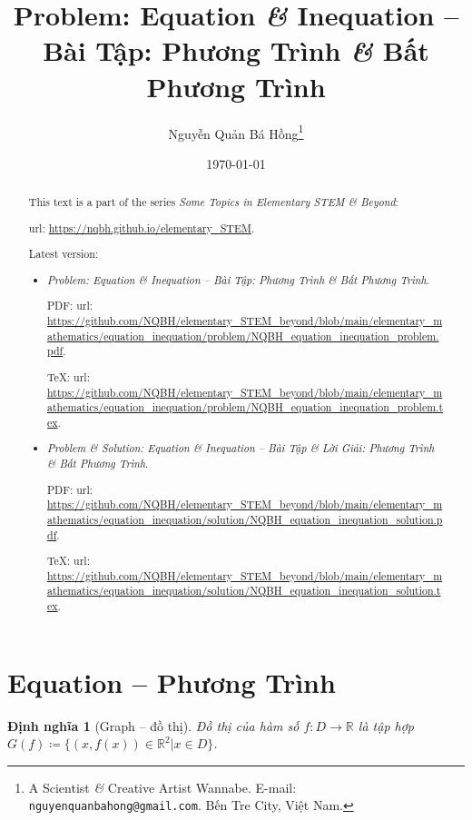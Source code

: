 \documentclass{article}
\title{Problem: Equation {\it\&} Inequation -- Bài Tập: Phương Trình {\it\&} Bất Phương Trình}
\author{Nguyễn Quản Bá Hồng\footnote{A Scientist {\it\&} Creative Artist Wannabe. E-mail: {\tt nguyenquanbahong@gmail.com}. Bến Tre City, Việt Nam.}}
\date{\today}
\newtheorem{dinhnghia}{Định nghĩa}
\begin{document}
\maketitle
\begin{abstract}
	This text is a part of the series {\it Some Topics in Elementary STEM \& Beyond}:
	
	{\sc url}: \url{https://nqbh.github.io/elementary_STEM}.
	
	Latest version:
	\begin{itemize}
		\item {\it Problem: Equation \& Inequation -- Bài Tập: Phương Trình \& Bất Phương Trình}.
		
		PDF: {\sc url}: \url{https://github.com/NQBH/elementary_STEM_beyond/blob/main/elementary_mathematics/equation_inequation/problem/NQBH_equation_inequation_problem.pdf}.
		
		\TeX: {\sc url}: \url{https://github.com/NQBH/elementary_STEM_beyond/blob/main/elementary_mathematics/equation_inequation/problem/NQBH_equation_inequation_problem.tex}.
		\item {\it Problem \& Solution: Equation \& Inequation -- Bài Tập \& Lời Giải: Phương Trình \& Bất Phương Trình}.
		
		PDF: {\sc url}: \url{https://github.com/NQBH/elementary_STEM_beyond/blob/main/elementary_mathematics/equation_inequation/solution/NQBH_equation_inequation_solution.pdf}.
		
		\TeX: {\sc url}: \url{https://github.com/NQBH/elementary_STEM_beyond/blob/main/elementary_mathematics/equation_inequation/solution/NQBH_equation_inequation_solution.tex}.
	\end{itemize}
\end{abstract}
\tableofcontents


\section{Equation -- Phương Trình}

\begin{dinhnghia}[Graph -- đồ thị]
	{\rm Đồ thị} của hàm số $f:D\to\mathbb{R}$ là tập hợp $G(f)\coloneqq\{(x,f(x))\in\mathbb{R}^2|x\in D\}$.
\end{dinhnghia}
\end{document}
